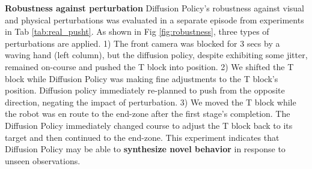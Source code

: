 \documentclass[Afour,sageh,times]{sagej}
\begin{document}
\textbf{Robustness against perturbation}
Diffusion Policy's robustness against visual and physical perturbations was evaluated in a separate episode from experiments in Tab \ref{tab:real_pusht}. As shown in Fig \ref{fig:robustness}, three types of perturbations are applied. 
1) The front camera was blocked for 3 secs by a waving hand (left column), but the diffusion policy, despite exhibiting some jitter, remained on-course and pushed the T block into position.
2) We shifted the T block while Diffusion Policy was making fine adjustments to the T block's position. Diffusion policy immediately re-planned to push from the opposite direction, negating the impact of perturbation. 
3) We moved the T block while the robot was en route to the end-zone after the first stage's completion. The Diffusion Policy immediately changed course to adjust the T block back to its target and then continued to the end-zone. This experiment indicates that Diffusion Policy may be able to \textbf{synthesize novel behavior} in response to unseen observations.
\end{document}
